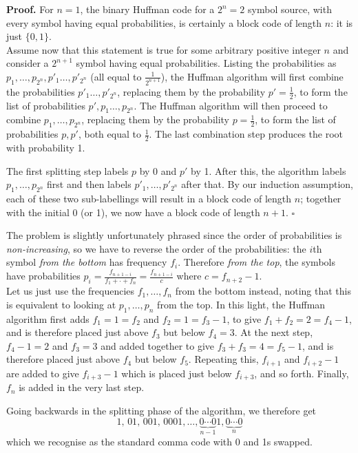 \documentclass[11pt]{article}
\newcommand{\qed}{\quad$\square$}
\begin{document}
\bigskip
{}
{\bf Proof.} For $n = 1$, the binary Huffman code for a $2^n = 2$ symbol source,
  with every symbol having equal probabilities, is certainly a block code of length $n$: it is just $\{0, 1\}$.\\
  Assume now that this statement is true for some arbitrary positive integer $n$
  and consider a $2^{n+1}$ symbol having equal probabilities.
  Listing the probabilities as $p_1,\ldots,p_{2^n},p'_1\ldots,p'_{2^n}$ (all equal to $\frac{1}{2^{n+1}}$),
  the Huffman algorithm will first combine the probabilities $p'_1\ldots,p'_{2^n}$,
  replacing them by the probability $p' = \frac{1}{2}$,
  to form the list of probabilities $p',p_1\ldots,p_{2^n}$.
  The Huffman algorithm will then proceed to combine $p_1,\ldots,p_{2^n}$,
  replacing them by the probability $p  = \frac{1}{2}$,
  to form the list of probabilities $p,p'$, both equal to $\frac{1}{2}$.
  The last combination step produces the root with probability 1.

  The first splitting step labels $p$ by 0 and $p'$ by 1.
  After this, the algorithm labels $p_1,\ldots,p_{2^n}$ first
  and then labels $p'_1,\ldots,p'_{2^n}$ after that.
  By our induction assumption, each of these two sub-labellings will result in a block code of length $n$;
  together with the initial 0 (or 1), we now have a block code of length $n+1$.
  \qed

\bigskip
{}
The problem is slightly unfortunately phrased since the order of probabilities is {\em non-increasing},
so we have to reverse the order of the probabilities:
the $i$th symbol {\em from the bottom} has frequency $f_i$.
Therefore {\em from the top},
the symbols have probabilities $p_i = \frac{f_{n+1-i}}{f_1 + \cdot + f_n} = \frac{f_{n+1-i}}{c}$ where $c = f_{n+2}-1$.\\
Let us just use the frequencies $f_1,\ldots,f_n$ from the bottom instead,
noting that this is equivalent to looking at $p_1,\ldots,p_n$ from the top.
In this light, the Huffman algorithm first adds $f_1 = 1 = f_2$ and $f_2 = 1 = f_3 - 1$,
to give $f_1 + f_2 = 2 = f_4 - 1$,
and is therefore placed just above $f_3$ but below $f_4 = 3$.
At the next step,
$f_4 - 1 = 2$ and $f_3 = 3$ and added together to give $f_3 + f_3 = 4 = f_5 - 1$,
and is therefore placed just above $f_4$ but below $f_5$.
Repeating this, $f_{i+1}$ and $f_{i+2} - 1$ are added to give $f_{i+3}-1$ which is placed just below $f_{i+3}$,
and so forth.
Finally,
$f_n$ is added in the very last step.

Going backwards in the splitting phase of the algorithm,
we therefore get
\[
  1,\,01,\,001,\,0001,\ldots,\underbrace{0\cdots0}_{n-1}1,\underbrace{0\cdots0}_n
\]
which we recognise as the standard comma code with 0 and 1s swapped.
\end{document}
